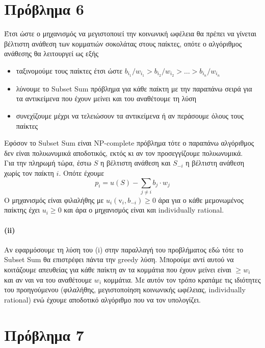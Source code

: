 \documentclass[a4paper,11pt]{article}
\newcommand{\vi}{\mathrm{v}}
\begin{document}
\section*{Πρόβλημα 6}

Έτσι ώστε ο μηχανισμός να μεγιστοποιεί την κοινωνική ωφέλεια θα πρέπει να γίνεται βέλτιστη ανάθεση των κομματιών σοκολάτας στους παίκτες, οπότε ο αλγόριθμος ανάθεσης θα λειτουργεί ως εξής
\begin{itemize}
	\item ταξινομούμε τους παίκτες έτσι ώστε $b_{i_1}/w_{i_1} > b_{i_2}/w_{i_2} > \dots > b_{i_n}/w_{i_n}$
	\item λύνουμε το \textrm{Subset Sum} πρόβλημα για κάθε παίκτη με την παραπάνω σειρά για τα αντικείμενα που έχουν μείνει και του αναθέτουμε τη λύση
	\item συνεχίζουμε μέχρι να τελειώσουν τα αντικείμενα ή αν περάσουμε όλους τους παίκτες
\end{itemize}
Εφόσον το \textrm{Subset Sum} είναι NP-complete πρόβλημα τότε ο παραπάνω αλγόριθμος δεν είναι πολυωνυμικά αποδοτικός, εκτός κι αν τον προσεγγίζουμε πολυωνυμικά.
\\[8pt]
Για την πληρωμή τώρα, έστω $S$ η βέλτιστη ανάθεση και $S_{-i}$ η βέλτιστη ανάθεση χωρίς τον παίκτη $i$.
Οπότε έχουμε
\[p_i = u(S) - \sum_{j \neq i} b_j \cdot w_j\]
Ο μηχανισμός είναι φιλαλήθης με $u_i(\vi_i,b_{-i}) \geq 0 $ άρα για ο κάθε μεμονωμένος παίκτης έχει $u_i \geq 0$ και άρα ο μηχανισμός είναι και individually rational.

\paragraph{(ii)} Αν εφαρμόσουμε τη λύση του (i) στην παραλλαγή του προβλήματος εδώ τότε το \textrm{Subset Sum} θα επιστρέφει πάντα την greedy λύση.
Μπορούμε αντί αυτού να κοιτάζουμε απευθείας για κάθε παίκτη αν τα κομμάτια που έχουν μείνει είναι $\geq w_i$ και αν ναι να του αναθέτουμε $w_i$ κομμάτια.
Με αυτόν τον τρόπο κρατάμε τις ιδιότητες του προηγούμενου (φιλαλήθης, μεγιστοποίηση κοινωνικής ωφέλειας, individually rational) ενώ έχουμε αποδοτικό αλγόριθμο που να τον υπολογίζει.


\section*{Πρόβλημα 7}
\end{document}
